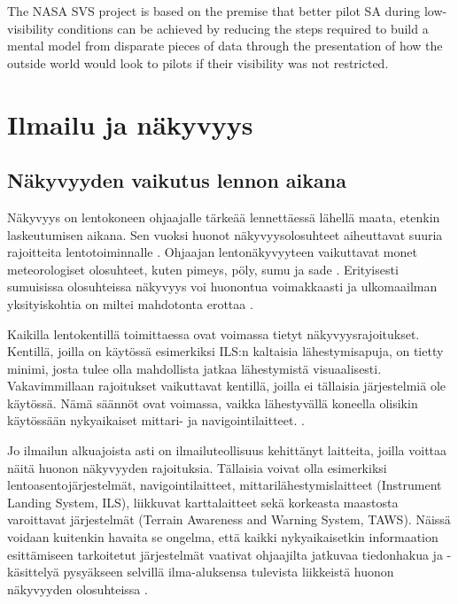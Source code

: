 \documentclass[utf8,bachelor,manualbib]{gradu3}
\begin{document}
The NASA SVS project is based on the premise that better pilot SA during
low-visibility conditions can be achieved by reducing the steps required to build a
mental model from disparate pieces of data through the presentation of how the
outside world would look to pilots if their visibility was not restricted. \citep{prinzel2004}

\chapter{Ilmailu ja näkyvyys}

\section{Näkyvyyden vaikutus lennon aikana}

Näkyvyys on lentokoneen ohjaajalle tärkeää lennettäessä lähellä maata, etenkin laskeutumisen aikana. Sen vuoksi huonot näkyvyysolosuhteet aiheuttavat suuria rajoitteita lentotoiminnalle \citep{mollersachs1994}. Ohjaajan lentonäkyvyyteen vaikuttavat monet meteorologiset olosuhteet, kuten pimeys, pöly, sumu ja sade \citep{wickens2009}. Erityisesti sumuisissa olosuhteissa näkyvyys voi huonontua voimakkaasti ja ulkomaailman yksityiskohtia on miltei mahdotonta erottaa \citep{beiergemperlein2004}.

Kaikilla lentokentillä toimittaessa ovat voimassa tietyt näkyvyysrajoitukset. Kentillä, joilla on käytössä esimerkiksi ILS:n kaltaisia lähestymisapuja, on tietty minimi, josta tulee olla mahdollista jatkaa lähestymistä visuaalisesti. Vakavimmillaan rajoitukset vaikuttavat kentillä, joilla ei tällaisia järjestelmiä ole käytössä. Nämä säännöt ovat voimassa, vaikka lähestyvällä koneella olisikin käytössään nykyaikaiset mittari- ja navigointilaitteet. \cite{mollersachs1994}.

Jo ilmailun alkuajoista asti on ilmailuteollisuus kehittänyt laitteita, joilla voittaa näitä huonon näkyvyyden rajoituksia. Tällaisia voivat olla esimerkiksi lentoasentojärjestelmät, navigointilaitteet, mittarilähestymislaitteet (Instrument Landing System, ILS), liikkuvat karttalaitteet sekä korkeasta maastosta varoittavat järjestelmät (Terrain Awareness and Warning System, TAWS). Näissä voidaan kuitenkin havaita se ongelma, että kaikki nykyaikaisetkin informaation esittämiseen tarkoitetut järjestelmät vaativat ohjaajilta jatkuvaa tiedonhakua ja -käsittelyä pysyäkseen selvillä ilma-aluksensa tulevista liikkeistä huonon näkyvyyden olosuhteissa \citep {prinzel2004}.
\end{document}
